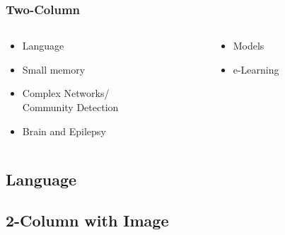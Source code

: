 \documentclass{beamer}
\begin{document}
\begin{frame}\frametitle{Two-Column}
	\begin{columns}[T]
	\begin{column}{.5\linewidth}   
	    	\begin{itemize}
		
			\item
			Language
		
			\item
			Small memory
		
			\item
			Complex Networks/\\Community Detection
		
			\item
			Brain and Epilepsy
		\end{itemize}
	\end{column}
	\begin{column}{.5\linewidth}
	    	\begin{itemize}
		
			\item
			Models
		
			\item
			e-Learning
			
		\end{itemize}
	\end{column}
	\end{columns}
\end{frame}




\subsection{Language}




\subsection{2-Column with Image}
\end{document}
